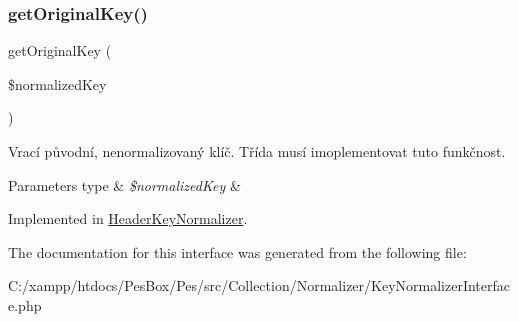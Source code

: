 \subsubsection{\texorpdfstring{get\+Original\+Key()}{getOriginalKey()}}
{\footnotesize\ttfamily get\+Original\+Key (\begin{DoxyParamCaption}\item[{}]{\$normalized\+Key }\end{DoxyParamCaption})}

Vrací původní, nenormalizovaný klíč. Třída musí imoplementovat tuto funkčnost. 
\begin{DoxyParams}[1]{Parameters}
type & {\em \$normalized\+Key} & \\
\hline
\end{DoxyParams}


Implemented in \mbox{\hyperlink{class_pes_1_1_http_1_1_header_key_normalizer_ad96b455525cff93be0dc81b5f6a4f8b9}{Header\+Key\+Normalizer}}.



The documentation for this interface was generated from the following file\+:\begin{DoxyCompactItemize}
\item 
C\+:/xampp/htdocs/\+Pes\+Box/\+Pes/src/\+Collection/\+Normalizer/Key\+Normalizer\+Interface.\+php\end{DoxyCompactItemize}
